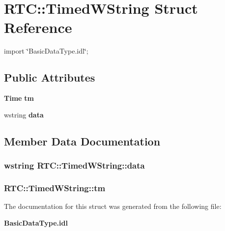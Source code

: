 \section{RTC::TimedWString Struct Reference}
\label{structRTC_1_1TimedWString}


{\ttfamily import \char`\"{}BasicDataType.idl\char`\"{};}

\subsection*{Public Attributes}
\begin{DoxyCompactItemize}
\item 
{\bf Time} {\bf tm}
\item 
wstring {\bf data}
\end{DoxyCompactItemize}


\subsection{Member Data Documentation}
\subsubsection[{data}]{\setlength{\rightskip}{0pt plus 5cm}wstring {\bf RTC::TimedWString::data}}\label{structRTC_1_1TimedWString_a76845810bab01058afc6ed2fc1cffa6f}
\subsubsection[{tm}]{ {\bf RTC::TimedWString::tm}}\label{structRTC_1_1TimedWString_a4ecdff5eccaaa9cf9f5fee7234c484ce}


The documentation for this struct was generated from the following file:\begin{DoxyCompactItemize}
\item 
{\bf BasicDataType.idl}\end{DoxyCompactItemize}
